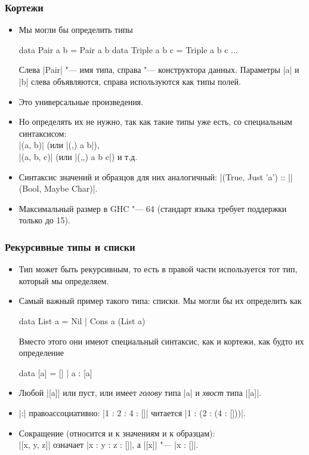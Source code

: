 \documentclass[10pt]{beamer}
\begin{document}
\begin{frame}[fragile]
  \frametitle{Кортежи}
  \begin{itemize}
    \item Мы могли бы определить типы
          \begin{haskell}
            data Pair a b = Pair a b
            data Triple a b c = Triple a b c
            ...
          \end{haskell}
          Слева \haskinline|Pair| "--- имя типа, справа "--- конструктора данных. Параметры \haskinline|a| и \haskinline|b| слева объявляются, справа используются как типы полей.
    \item Это универсальные произведения.
          \pause
    \item Но определять их не нужно, так как такие типы уже есть, со специальным синтаксисом:\\
          \haskinline|(a, b)| (или \haskinline|(,) a b|),\\ \haskinline|(a, b, c)| (или \haskinline|(,,) a b c|) и т.д.
    \item Синтаксис значений и образцов для них аналогичный:
          \haskinline|(True, Just 'a') :: |\pause\haskinline|(Bool, Maybe Char)|.
    \item Максимальный размер в GHC "--- 64 (стандарт языка требует поддержки только до 15).
  \end{itemize}
\end{frame}

\begin{frame}[fragile]
  \frametitle{Рекурсивные типы и списки}
  \begin{itemize}
    \item Тип может быть рекурсивным, то есть в правой части используется тот тип, который мы определяем.
    \item Самый важный пример такого типа: списки.
          Мы могли бы их определить как
          \begin{haskell}
            data List a = Nil | Cons a (List a)
          \end{haskell}
          Вместо этого они имеют специальный синтаксис, как и кортежи, как будто их определение
          \begin{haskell}
            data [a] = [] | a : [a]
          \end{haskell}
    \item Любой \haskinline|[a]| или пуст, или имеет \emph{голову} типа \haskinline|a| и \emph{хвост} типа \haskinline|[a]|.
    \item \haskinline|:| правоассоциативно: \haskinline|1 : 2 : 4 : []| читается \haskinline|1 : (2 : (4 : []))|.
    \item Сокращение (относится и к значениям и к образцам):\\
          \haskinline|[x, y, z]| означает \haskinline|x : y : z : []|, а \haskinline|[x]| "--- \haskinline|x : []|.
  \end{itemize}
\end{frame}
\end{document}
